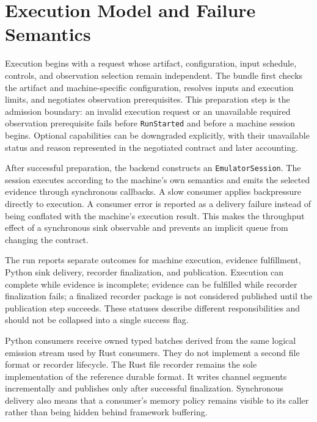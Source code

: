\section{Execution Model and Failure Semantics}

Execution begins with a request whose artifact, configuration, input schedule,
controls, and observation selection remain independent. The bundle first
checks the artifact and machine-specific configuration, resolves inputs and
execution limits, and negotiates observation prerequisites. This preparation
step is the admission boundary: an invalid execution request or an
unavailable required observation prerequisite fails before \texttt{RunStarted}
and before a machine session begins. Optional capabilities can be downgraded
explicitly, with their unavailable status and reason represented in the
negotiated contract and later accounting.

After successful preparation, the backend constructs an
\texttt{EmulatorSession}. The session executes according to the machine's own
semantics and emits the selected evidence through synchronous callbacks. A
slow consumer applies backpressure directly to execution. A consumer error is
reported as a delivery failure instead of being conflated with the machine's
execution result. This makes the throughput effect of a synchronous sink
observable and prevents an implicit queue from changing the contract.

The run reports separate outcomes for machine execution, evidence
fulfillment, Python sink delivery, recorder finalization, and publication.
Execution can complete while evidence is incomplete; evidence can be
fulfilled while recorder finalization fails; a finalized recorder package is
not considered published until the publication step succeeds. These statuses
describe different responsibilities and should not be collapsed into a
single success flag.

Python consumers receive owned typed batches derived from the same logical
emission stream used by Rust consumers. They do not implement a second file
format or recorder lifecycle. The Rust file recorder remains the sole
implementation of the reference durable format. It writes channel segments
incrementally and publishes only after successful finalization. Synchronous
delivery also means that a consumer's memory policy remains visible to its
caller rather than being hidden behind framework buffering.
